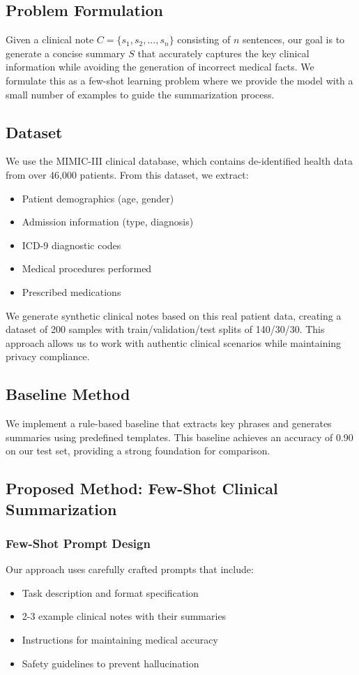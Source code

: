 \documentclass[sigconf]{acmart}
\begin{document}
\subsection{Problem Formulation}
Given a clinical note $C = \{s_1, s_2, ..., s_n\}$ consisting of $n$ sentences, our goal is to generate a concise summary $S$ that accurately captures the key clinical information while avoiding the generation of incorrect medical facts. We formulate this as a few-shot learning problem where we provide the model with a small number of examples to guide the summarization process.

\subsection{Dataset}
We use the MIMIC-III clinical database, which contains de-identified health data from over 46,000 patients. From this dataset, we extract:
\begin{itemize}
    \item Patient demographics (age, gender)
    \item Admission information (type, diagnosis)
    \item ICD-9 diagnostic codes
    \item Medical procedures performed
    \item Prescribed medications
\end{itemize}

We generate synthetic clinical notes based on this real patient data, creating a dataset of 200 samples with train/validation/test splits of 140/30/30. This approach allows us to work with authentic clinical scenarios while maintaining privacy compliance.

\subsection{Baseline Method}
We implement a rule-based baseline that extracts key phrases and generates summaries using predefined templates. This baseline achieves an accuracy of 0.90 on our test set, providing a strong foundation for comparison.

\subsection{Proposed Method: Few-Shot Clinical Summarization}

\subsubsection{Few-Shot Prompt Design}
Our approach uses carefully crafted prompts that include:
\begin{itemize}
    \item Task description and format specification
    \item 2-3 example clinical notes with their summaries
    \item Instructions for maintaining medical accuracy
    \item Safety guidelines to prevent hallucination
\end{itemize}
\end{document}
